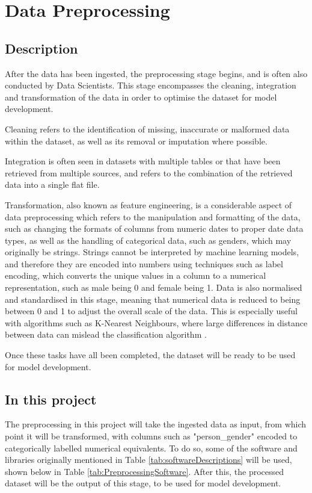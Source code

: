 \documentclass[12pt]{report}
\begin{document}
\section{Data Preprocessing}\label{sec:Preprocessing}
\subsection{Description}
After the data has been ingested, the preprocessing stage begins, and is often also conducted by 
Data Scientists. This stage encompasses the
cleaning, integration and transformation of the data in order to optimise the dataset for model development.

Cleaning refers to the identification of missing, inaccurate or malformed data within the dataset,
as well as its removal or imputation where possible.

Integration is often seen in datasets with multiple tables or that have been retrieved from multiple sources,
and refers to the combination of the retrieved data into a single flat file. 

Transformation, also known as feature engineering, is a considerable aspect of data preprocessing
which refers to the manipulation and formatting of the data, such as changing the formats of columns 
from numeric dates to proper date data types, as well as the handling of categorical data, such as genders, 
which may originally be strings. Strings cannot be interpreted by machine learning models, and therefore they 
are encoded into numbers using techniques such as label encoding, which converts the unique values in a column
to a numerical representation, such as male being 0 and female being 1. Data is also normalised and standardised 
in this stage, meaning that numerical data is reduced to being between 0 and 1 to adjust the overall scale of the 
data. This is especially useful with algorithms such as K-Nearest Neighbours, where large differences in distance 
between data can mislead the classification algorithm \autocite{ibm_what_2021}.

Once these tasks have all been completed, the dataset will be ready to be used for model development.

\subsection{In this project}
The preprocessing in this project will take the ingested data as input, from which point it will be transformed,
with columns such as "person\_gender" encoded to categorically labelled numerical equivalents. To do so, some of the software
and libraries originally mentioned in Table \ref{tab:softwareDescriptions} will be used, shown below in Table \ref{tab:PreprocessingSoftware}.
After this, the processed dataset will be the output of this stage, to be used for model development.
\end{document}
